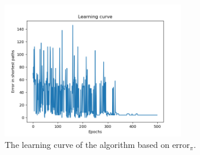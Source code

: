 \documentclass[10pt, a4paper]{article}
\begin{document}
\begin{figure}[H]
	\centering
	\includegraphics[width=0.7\textwidth]{fig/learning_curve.png}
	\caption{The learning curve of the algorithm based on error$_\pi$.}
	\label{learning}
\end{figure}
\end{document}
